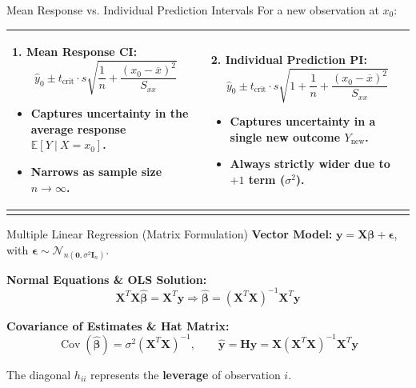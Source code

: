\documentclass[aspectratio=169,ignorenonframetext]{beamer}
\begin{document}
\begin{frame}{Mean Response vs. Individual Prediction Intervals}
For a new observation at \(x_{0}\):

{\def\LTcaptype{none} %
\begin{longtable}[]{@{}
  >{\raggedright\arraybackslash}p{}
  >{\raggedright\arraybackslash}p{}@{}}
\toprule\noalign{}
\endhead
\begin{minipage}[t]{\linewidth}\raggedright
\textbf{1. Mean Response CI:}
\[{\hat{y}}_{0} \pm t_{\text{crit}} \cdot s\sqrt{\frac{1}{n} + \frac{\left( x_{0} - \overline{x} \right)^{2}}{S_{xx}}}\]

\begin{itemize}
\item
  Captures uncertainty in the \textbf{average response}
  \(\mathbb{E}\left\lbrack Y~|~X = x_{0} \right\rbrack\).
\item
  Narrows as sample size \(n \rightarrow \infty\).
\end{itemize}
\end{minipage} & \begin{minipage}[t]{\linewidth}\raggedright
\textbf{2. Individual Prediction PI:}
\[{\hat{y}}_{0} \pm t_{\text{crit}} \cdot s\sqrt{1 + \frac{1}{n} + \frac{\left( x_{0} - \overline{x} \right)^{2}}{S_{xx}}}\]

\begin{itemize}
\item
  Captures uncertainty in a \textbf{single new outcome}
  \(Y_{\text{new}}\).
\item
  Always strictly wider due to \(+ 1\) term (\(\sigma^{2}\)).
\end{itemize}
\end{minipage} \\
\bottomrule\noalign{}
\end{longtable}
}
\end{frame}

\begin{frame}{Multiple Linear Regression (Matrix Formulation)}
\textbf{Vector Model:}
\(\mathbf{y} = \mathbf{X}\mathbf{\beta} + \mathbf{\epsilon}\), with
\(\mathbf{\epsilon} \sim \mathcal{N}_{n\left( \mathbf{0},\sigma^{2}\mathbf{I}_{n} \right)}\).

\textbf{Normal Equations \& OLS Solution:}
\[\mathbf{X}^{T}\mathbf{X}\hat{\mathbf{\beta}} = \mathbf{X}^{T}\mathbf{y} \Longrightarrow \hat{\mathbf{\beta}} = \left( \mathbf{X}^{T}\mathbf{X} \right)^{- 1}\mathbf{X}^{T}\mathbf{y}\]

\textbf{Covariance of Estimates \& Hat Matrix:}
\[\operatorname{Cov}(\hat{\mathbf{\beta}}) = \sigma^{2}\left( \mathbf{X}^{T}\mathbf{X} \right)^{- 1},\quad\quad\hat{\mathbf{y}} = \mathbf{H}\mathbf{y} = {\mathbf{X}(\mathbf{X}^{T}\mathbf{X})}^{- 1}\mathbf{X}^{T}\mathbf{y}\]

The diagonal \(h_{ii}\) represents the \textbf{leverage} of observation
\(i\).
\end{frame}
\end{document}
